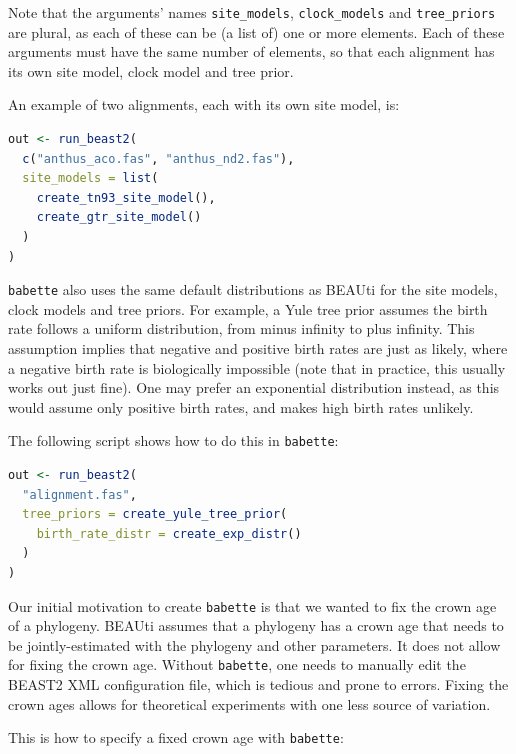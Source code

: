 \documentclass{article}
\begin{document}
Note that the arguments' names \verb;site_models;, \verb;clock_models; and \verb;tree_priors; are plural, as each of these
can be (a list of) one or more elements. Each of these arguments must have the same number of elements, so that each alignment has its
own site model, clock model and tree prior. 

An example of two alignments, each with its own site model, is:

\begin{lstlisting}[language=R, caption=Two alignments, label=lst:two_alignments, floatplacement=H]
out <- run_beast2(
  c("anthus_aco.fas", "anthus_nd2.fas"),
  site_models = list(
    create_tn93_site_model(), 
    create_gtr_site_model()
  )
)
\end{lstlisting}

\verb;babette; also uses the same default distributions as BEAUti 
for the site models, clock models and tree priors. 
For example, a Yule tree prior assumes the birth rate follows a uniform distribution, 
from minus infinity to plus infinity. 
This assumption implies that negative and positive birth rates are just as likely, 
where a negative birth rate is biologically impossible (note that 
in practice, this usually works out just fine).
One may prefer an exponential distribution instead, 
as this would assume only positive birth rates, 
and makes high birth rates unlikely.

The following script shows how to do this in \verb;babette;:

\begin{lstlisting}[language=R, caption=Example with Yule tree prior with different birth rate distribution, label=lst:diff_distr, floatplacement=H]
out <- run_beast2(
  "alignment.fas",
  tree_priors = create_yule_tree_prior(
    birth_rate_distr = create_exp_distr()    
  )
)
\end{lstlisting}

Our initial motivation to create \verb;babette; 
is that we wanted to fix the crown age of a phylogeny.
BEAUti assumes that a phylogeny has a crown age that needs to be jointly-estimated
with the phylogeny and other parameters. It does not allow for fixing
the crown age. Without \verb;babette;, one needs to manually edit the BEAST2 
XML configuration file, which is tedious and prone to errors. 
Fixing the crown ages allows for theoretical experiments 
with one less source of variation.

This is how to specify a fixed crown age with \verb;babette;:
\end{document}
